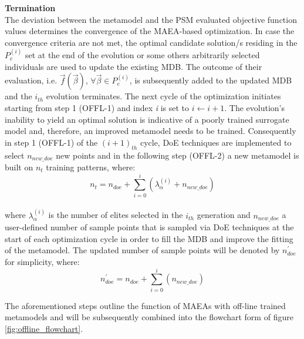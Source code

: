 \begin{OFFL}
\item \textbf{Termination}\\
The deviation between the metamodel and the PSM evaluated 
objective function values determines the convergence of the 
MAEA-based optimization. In case the convergence criteria are not 
met, the optimal candidate solution/s residing in 
the $P_{e}^{(i)}$ set at the end of the evolution or some others 
arbitrarily selected individuals are used to update the 
existing MDB. The outcome of their evaluation, i.e. 
$\vec{f}(\vec{β})$, $\forall \vec{β} \!\in \!P_{e}^{(i)}$, is 
subsequently added to the updated MDB and the $i_{th}$ evolution 
terminates. The next cycle of the optimization initiates 
starting from step 1 (OFFL-1) and index \textit{i} is set to 
$i \leftarrow i+1$. The evolution's inability to yield an 
optimal solution is indicative of a poorly trained surrogate 
model and, therefore, an improved metamodel needs to be 
trained. Consequently in step 1 (OFFL-1) of the $(i+1)_{th}$ 
cycle, DoE techniques are implemented to select $n_{new\_doe}$ 
new points and in the following step (OFFL-2) a new metamodel 
is built on $n_{t}$ training patterns, where:
\begin{equation}\label{off_line_nt}
n_{t} = n_{doe} + \sum_{i=0}^{i} \left( λ_{α}^{(i)} +
n_{new\_doe} \right) 
\end{equation}
\\[-0.1cm]
where $λ_{α}^{(i)}$ is the number of elites selected in the 
$i_{th}$ generation and $n_{new\_doe}$ a user-defined number of 
sample points that is sampled via DoE techniques at the start 
of each optimization cycle in order to fill the MDB and improve 
the fitting of the metamodel. The updated number of sample points 
will be denoted by $n_{doe}^{'}$ for simplicity, where:
\begin{equation}
n_{doe}^{'} = n_{doe} + \sum_{i=0}^{i} \left(n_{new\_doe} \right)
\end{equation} 

The aforementioned steps outline the function of MAEAs with 
off-line trained metamodels and will be subsequently combined into 
the flowchart form of figure \ref{fig:offline_flowchart}.
\end{OFFL} 

\newpage


